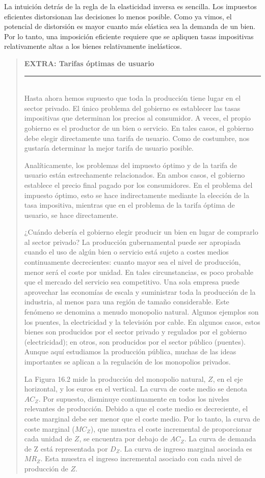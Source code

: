 \documentclass[10pt,a4paper]{article}
\newenvironment{specialblock}[1]{%
      \begin{quote} %
      \small %
      \noindent\textbf{#1}\\[-0.3em] %
      \rule{\linewidth}{0.4pt}\\[0.6em]}{
      \end{quote}}
\begin{document}
La intuición detrás de la regla de la elasticidad inversa es sencilla. Los impuestos eficientes distorsionan las decisiones lo menos posible. Como ya vimos, el potencial de distorsión es mayor cuanto más elástica sea la demanda de un bien. Por lo tanto, una imposición eficiente requiere que se apliquen tasas impositivas relativamente altas a los bienes relativamente inelásticos.

\begin{specialblock}{\textbf{EXTRA: Tarifas óptimas de usuario}}
    Hasta ahora hemos supuesto que toda la producción tiene lugar en el sector privado. El único problema del gobierno es establecer las tasas impositivas que determinan los precios al consumidor. A veces, el propio gobierno es el productor de un bien o servicio. En tales casos, el gobierno debe elegir directamente una tarifa de usuario. Como de costumbre, nos gustaría determinar la mejor tarifa de usuario posible.
    
    Analíticamente, los problemas del impuesto óptimo y de la tarifa de usuario están estrechamente relacionados. En ambos casos, el gobierno establece el precio final pagado por los consumidores. En el problema del impuesto óptimo, esto se hace indirectamente mediante la elección de la tasa impositiva, mientras que en el problema de la tarifa óptima de usuario, se hace directamente.
    
    ¿Cuándo debería el gobierno elegir producir un bien en lugar de comprarlo al sector privado? La producción gubernamental puede ser apropiada cuando el uso de algún bien o servicio está sujeto a costes medios continuamente decrecientes: cuanto mayor sea el nivel de producción, menor será el coste por unidad. En tales circunstancias, es poco probable que el mercado del servicio sea competitivo. Una sola empresa puede aprovechar las economías de escala y suministrar toda la producción de la industria, al menos para una región de tamaño considerable. Este fenómeno se denomina a menudo monopolio natural. Algunos ejemplos son los puentes, la electricidad y la televisión por cable. En algunos casos, estos bienes son producidos por el sector privado y regulados por el gobierno (electricidad); en otros, son producidos por el sector público (puentes). Aunque aquí estudiamos la producción pública, muchas de las ideas importantes se aplican a la regulación de los monopolios privados.
    
    La Figura 16.2 mide la producción del monopolio natural, $Z$, en el eje horizontal, y los euros en el vertical. La curva de coste medio se denota $AC_Z$. Por supuesto, disminuye continuamente en todos los niveles relevantes de producción. Debido a que el coste medio es decreciente, el coste marginal debe ser menor que el coste medio. Por lo tanto, la curva de coste marginal ($MC_Z$), que muestra el coste incremental de proporcionar cada unidad de $Z$, se encuentra por debajo de $AC_Z$. La curva de demanda de Z está representada por $D_Z$. La curva de ingreso marginal asociada es $MR_Z$. Esta muestra el ingreso incremental asociado con cada nivel de producción de $Z$.
    

\end{specialblock}
\end{document}
